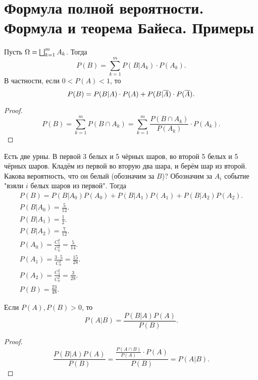 \section{Формула полной вероятности. Формула и теорема Байеса. Примеры}


\begin{theorem}
    Пусть $\Omega = \bigsqcup_{k=1}^m{A_k}$. Тогда
         $$P(B) = \sum_{k=1}^m P(B|A_k)\cdot P(A_k).$$
         В частности, если $0 < P(A) < 1$, то
         $$P(B) = P(B|A) \cdot P(A)+P(B|\overline{A}) \cdot P(\overline{A}).$$
     \end{theorem}
    
     \begin{proof}
         $$P(B) = \sum_{k=1}^m P(B \cap A_k) = \sum_{k=1}^m \frac{P(B\cap A_k)}{P(A_k)}\cdot P(A_k).$$
    
     \end{proof}
    
     \begin{example} Есть две урны. В первой 3 белых и 5 чёрных шаров, во второй 5 белых и 5 чёрных шаров. Кладём из первой во вторую два шара, и берём шар из второй. Какова вероятность, что он белый (обозначим за $B$)?
    Обозначим за $A_i$ событие "взяли $i$ белых шаров из первой". Тогда
    \begin{gather*}
        P(B) = P(B|A_0)P(A_0) + P(B|A_1)P(A_1)+P(B|A_2)P(A_2).\\
        P(B|A_0) = \frac{5}{12}.\\
        P(B|A_1) = \frac{1}{2}.\\
        P(B|A_2) = \frac{7}{12}.\\
        P(A_0) = \frac{C_5^2}{C_8^2} = \frac{5}{14}.\\
        P(A_1) = \frac{3\cdot 5}{C_8^2} = \frac{15}{28}.\\
        P(A_2) = \frac{C_3^2}{C_8^2} = \frac{3}{28}.\\
        P(B) = \frac{23}{48}.
    \end{gather*}
     \end{example}
    
     \begin{theorem}
    Если $P(A), P(B) > 0$, то
         $$P(A|B) = \frac{P(B|A)P(A)}{P(B)}.$$
     \end{theorem}
    
     \begin{proof}
         $$\frac{P(B|A)P(A)}{P(B)} = \frac{\frac{P(A\cap B)}{P(A)}\cdot P(A)}{P(B)} = P(A|B).$$
     \end{proof}
    
